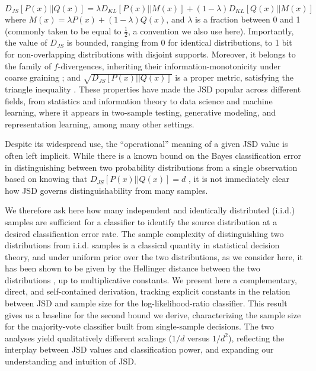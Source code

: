 \documentclass{article}
\begin{document}
\begin{equation} D_{JS}[P(x)||Q(x)] = \lambda D_{KL}[P(x)||M(x)] +(1-\lambda) D_{KL}[Q(x)||M(x)] 
\end{equation} 
where $M(x)=\lambda P(x)+ (1-\lambda) Q(x)$, and  $\lambda$ is a fraction between 0 and 1 (commonly taken to be equal to $\frac{1}{2}$, a convention we also use here). Importantly, the value of $D_{JS}$ is bounded, ranging from 0 for identical distributions, to 1 bit for non-overlapping distributions with disjoint supports. Moreover, it belongs to the family of $f$-divergences, inheriting their information-monotonicity under coarse graining \cite{csiszar_information_67, csiszar_information_2004,amari_alpha}; and
$\sqrt{D_{JS}[P(x)||Q(x)]}$ is a proper metric, satisfying the triangle inequality \cite{endres_new_metric}. These properties have made the JSD popular across different fields, from statistics and information theory to data science and machine learning, where it appears in two-sample testing, generative modeling, and representation learning, among many other settings.
 
Despite its widespread use, the ``operational'' meaning of a given JSD value is often left implicit. While there is a known bound on the Bayes classification error in distinguishing between two probability distributions from a single observation based on knowing that $D_{JS}[P(x)||Q(x)]=d$ \cite{lin_divergence_1991}, it is not immediately clear how JSD governs distinguishability from many samples.

We therefore ask here how many independent and identically distributed (i.i.d.) samples are sufficient for a classifier to identify the source distribution at a desired classification error rate. The sample complexity of distinguishing two distributions from i.i.d. samples is a classical quantity in statistical decision theory, and under uniform prior over the two distributions, as we consider here, it has been shown to be given by the Hellinger distance between the two distributions \cite{bar_yossef_thesis, pensia_sample}, up to multiplicative constants. We present here a complementary, direct, and self-contained derivation, tracking explicit constants in the relation between JSD and sample size for the log-likelihood-ratio classifier. This result gives us a baseline for the second bound we derive, characterizing the sample size for the majority-vote classifier built from single-sample decisions. The two analyses yield qualitatively different scalings ($1/d$ versus $1/d^{2}$), reflecting the interplay between JSD values and classification power, and expanding our understanding and intuition of JSD.
\end{document}

